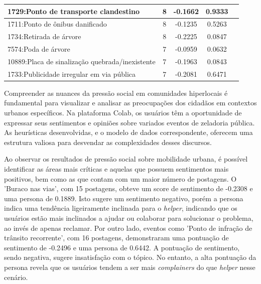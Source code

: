 \begin{table}[htbp]
\begin{tabular}{|l|c|c|c|c|}
		\hline
		1729:Ponto de transporte clandestino            & 8                & -0.1662        & 0.9333           \\
		\hline
		1711:Ponto de ônibus danificado                 & 8                & -0.1235        & 0.5263           \\
		\hline
		1734:Retirada de árvore                         & 8                & -0.2225        & 0.0847           \\
		\hline
		7574:Poda de árvore                             & 7                & -0.0959        & 0.0632           \\
		\hline
		10889:Placa de sinalização quebrada/inexistente & 7                & -0.1963        & 0.0843           \\
		\hline
		1733:Publicidade irregular em via pública       & 7                & -0.2081        & 0.6471           \\
		\hline
	\end{tabular}
\end{table}

Compreender as nuances da pressão social em comunidades hiperlocais é fundamental para visualizar e analisar as preocupações dos cidadãos em contextos urbanos específicos. Na plataforma Colab, os usuários têm a oportunidade de expressar seus sentimentos e opiniões sobre variados eventos de zeladoria pública. As heurísticas desenvolvidas, e o modelo de dados correspondente, oferecem uma estrutura valiosa para desvendar as complexidades desses discursos.

Ao observar os resultados de pressão social sobre mobilidade urbana, é possível identificar as áreas mais críticas e aquelas que possuem sentimentos mais positivos, bem como as que contam com um maior número de postagens. O 'Buraco nas vias', com 15 postagens, obteve um score de sentimento de -0.2308 e uma persona de 0.1889. Isto sugere um sentimento negativo, porém a persona indica uma tendência ligeiramente inclinada para o \textit{helper}, indicando que os usuários estão mais inclinados a ajudar ou colaborar para solucionar o problema, ao invés de apenas reclamar. Por outro lado, eventos como 'Ponto de infração de trânsito recorrente', com 16 postagens, demonstraram uma pontuação de sentimento de -0.2496 e uma persona de 0.6442. A pontuação de sentimento, sendo negativa, sugere insatisfação com o tópico. No entanto, a alta pontuação da persona revela que os usuários tendem a ser mais \textit{complainers} do que \textit{helper} nesse cenário.

